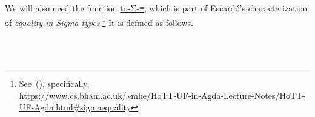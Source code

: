 We will also need the function
\href{https://www.cs.bham.ac.uk/~mhe/HoTT-UF-in-Agda-Lecture-Notes/HoTT-UF-Agda.html\#sigmaequality}{to-Σ-≡},
which is part of Escardó's characterization of \emph{equality in Sigma types}.\footnote{See~(\cite{MHE}), specifically,\\\url{https://www.cs.bham.ac.uk/~mhe/HoTT-UF-in-Agda-Lecture-Notes/HoTT-UF-Agda.html\#sigmaequality}} It is defined as follows.
\ccpad
\begin{code}%
\>[1]\AgdaSpace{}%
\AgdaSymbol{:}\AgdaSpace{}%
\>[111I]\AgdaSymbol{\{}\AgdaSpace{}%
\AgdaSymbol{:}\AgdaSpace{}%
\AgdaSpace{}%
%
\AgdaSymbol{\}}\AgdaSpace{}%
\AgdaSymbol{\{}\AgdaSpace{}%
\AgdaSymbol{:}\AgdaSpace{}%
\AgdaSpace{}%
\AgdaSpace{}%
\AgdaSpace{}%
%
\AgdaSymbol{\}}\AgdaSpace{}%
\AgdaSymbol{\{}\AgdaSpace{}%
\AgdaSpace{}%
\AgdaSymbol{:}\AgdaSpace{}%
\AgdaSpace{}%
\AgdaSymbol{\}}\<%
\\
\>[1][@{}l@{\AgdaIndent{0}}]%
\>[2]%
\>[.][@{}l@{}]\<[111I]%
\>[10]\AgdaSpace{}%
\AgdaSpace{}%
\AgdaSpace{}%
\AgdaSpace{}%
\AgdaSpace{}%
\AgdaSpace{}%
\AgdaSpace{}%
\AgdaSpace{}%
\AgdaSpace{}%
\AgdaSpace{}%
\AgdaFunction{,}\AgdaSpace{}%
\AgdaSymbol{(}\AgdaSpace{}%
\AgdaSpace{}%
\AgdaSpace{}%
\AgdaSpace{}%
\AgdaSpace{}%
\AgdaSymbol{)}\AgdaSpace{}%
\AgdaSpace{}%
\AgdaSpace{}%
\AgdaSpace{}%
\<%
\\

\end{code}
